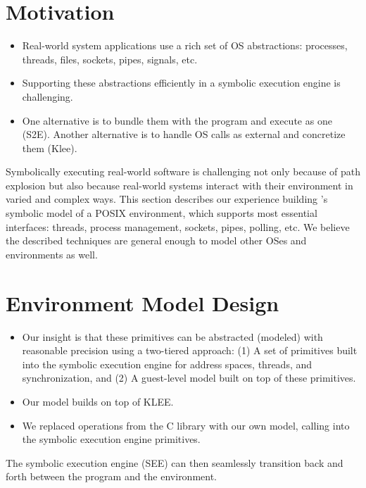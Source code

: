 \section{Motivation}

\begin{itemize}
\item Real-world system applications use a rich set of OS abstractions: processes, threads, files, sockets, pipes, signals, etc.
\item Supporting these abstractions efficiently in a symbolic execution engine is challenging.
\item One alternative is to bundle them with the program and execute as one (S2E). Another alternative is to handle OS calls as external and concretize them (Klee).
\end{itemize}

Symbolically executing real-world software is challenging not only because of path explosion but also because real-world systems interact with their environment in varied and complex ways. This section describes our experience building \cnine's symbolic model of a POSIX environment, which supports most essential interfaces: threads, process management, sockets, pipes, polling, etc. We believe the described techniques are general enough to model other OSes and environments as well.


\section{Environment Model Design}

\begin{itemize}
\item Our insight is that these primitives can be abstracted (modeled) with reasonable precision using a two-tiered approach: (1) A set of primitives built into the symbolic execution engine for address spaces, threads, and synchronization, and (2) A guest-level model built on top of these primitives.
\item Our model builds on top of KLEE.
\item We replaced operations from the C library with our own model, calling into the symbolic execution engine primitives.
\end{itemize}

  The symbolic execution engine (SEE) can then seamlessly transition back and forth between the program and the environment.

